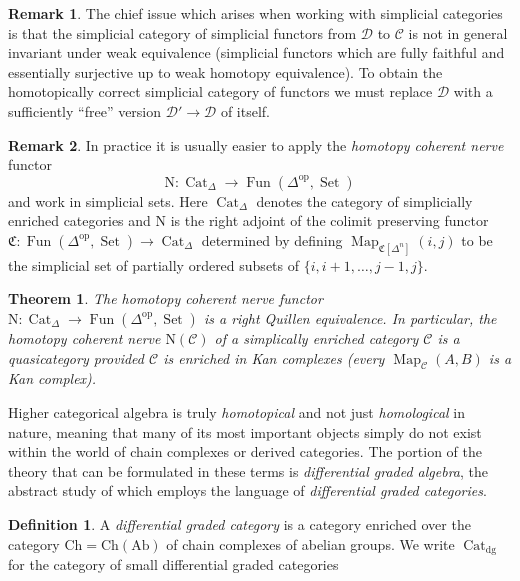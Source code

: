 \documentclass{article}
\newtheorem{theorem}{Theorem}[subsection]
\theoremstyle{definition}
\newtheorem{definition}{Definition}[subsection]
\newtheorem{remark}{Remark}[subsection]
\newcommand{\C}{\mathcal{C}}
\newcommand{\D}{\mathcal{D}}
\newcommand{\CCC}{\mathfrak{C}}
\newcommand{\too}{\longrightarrow}
\newcommand{\op}{\mathrm{op}}
\DeclareMathOperator{\Cat}{Cat}
\DeclareMathOperator{\Fun}{Fun}
\DeclareMathOperator{\Map}{Map}
\DeclareMathOperator{\Set}{Set}
\newcommand{\Ab}{\mathrm{Ab}}
\begin{document}
\begin{remark}
The chief issue which arises when working with simplicial categories is that the simplicial category of simplicial functors from $\D$ to $\C$ is not in general invariant under weak equivalence (simplicial functors which are fully faithful and essentially surjective up to weak homotopy equivalence).
To obtain the homotopically correct simplicial category of functors we must replace $\D$ with a sufficiently ``free'' version $\D'\to\D$ of itself.
\end{remark}
\begin{remark}
In practice it is usually easier to apply the {\em homotopy coherent nerve} functor
\[
\mathrm{N}:\Cat_\Delta\too\Fun(\Delta^{\op},\Set)
\]
and work in simplicial sets.
Here $\Cat_\Delta$ denotes the category of simplicially enriched categories and $\mathrm{N}$ is the right adjoint of the colimit preserving functor $\CCC:\Fun(\Delta^{\op},\Set)\to\Cat_\Delta$\index{$\CCC$} determined by defining
$
\Map_{\CCC[\Delta^n]}(i,j)
$
to be the simplicial set of partially ordered subsets of $\{i,i+1,\ldots,j-1,j\}$.
\end{remark}
\begin{theorem}{\em \cite[Theorem 2.2.5.1]{HTT}}
The homotopy coherent nerve functor $\mathrm{N}:\Cat_\Delta\to\Fun(\Delta^{\op},\Set)$ is a right Quillen equivalence.
In particular, the homotopy coherent nerve $\mathrm{N}(\C)$ of a simplically enriched category $\C$ is a quasicategory provided $\C$ is enriched in Kan complexes (every $\Map_\C(A,B)$ is a Kan complex).
\end{theorem}


Higher categorical algebra is truly {\em homotopical} and not just {\em homological} in nature, meaning that many  of its most important objects simply do not exist within the world of chain complexes or derived categories.
The portion of the theory that can be formulated in these terms is {\em differential graded algebra}, the abstract study of which employs the language of {\em differential graded categories}.

\begin{definition}
A {\em differential graded category}
is a category enriched over the category $\mathrm{Ch}=\mathrm{Ch}(\Ab)$ of chain complexes of abelian groups.
We write $\Cat_\mathrm{dg}$\index{$\Cat_\mathrm{dg}$} for the category of small differential graded categories
\end{definition}
\end{document}
